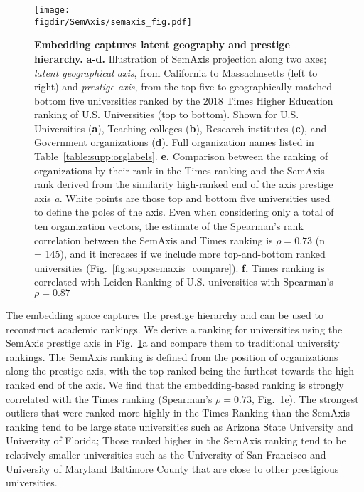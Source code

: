 \documentclass[12pt]{article} %
\def\figdir{../Figs}
\begin{document}
%
%
\begin{figure}[hp!]
	\centering
	\texttt{[image: \\figdir/SemAxis/semaxis\_fig.pdf]}
	\caption{
		\textbf{Embedding captures latent geography and prestige hierarchy.}
		\textbf{a-d.} Illustration of SemAxis projection along two axes;  \textit{latent geographical axis}, from California to Massachusetts (left to right) and \textit{prestige axis}, from the top five to geographically-matched bottom five universities ranked by the 2018 Times Higher Education ranking of U.S. Universities (top to bottom).
		Shown for U.S. Universities (\textbf{a}), Teaching colleges (\textbf{b}), Research institutes (\textbf{c}), and Government organizations (\textbf{d}).
		Full organization names listed in Table~\ref{table:supp:orglabels}.
		\textbf{e.} Comparison between the ranking of organizations by their rank in the Times ranking and the SemAxis rank derived from the similarity high-ranked end of the axis prestige axis \textit{a}.
		White points are those top and bottom five universities used to define the poles of the axis.
	  	Even when considering only a total of ten organization vectors, the estimate of the Spearman's rank correlation between the SemAxis and Times ranking is $\rho = 0.73$ (n = 145), and it increases if we include more top-and-bottom ranked universities (Fig.~\ref{fig:supp:semaxis_compare}).
	  	\textbf{f.} Times ranking is correlated with Leiden Ranking of U.S. universities with Spearman's $\rho = 0.87$
	}
	\label{fig:semaxis}
\end{figure}

The embedding space captures the prestige hierarchy and can be used to reconstruct academic rankings. 
We derive a ranking for universities using the SemAxis prestige axis in Fig.~\ref{fig:semaxis}a and compare them to traditional university rankings.
The SemAxis ranking is defined from the position of organizations along the prestige axis, with the top-ranked being the furthest towards the high-ranked end of the axis.
We find that the embedding-based ranking is strongly correlated with the Times ranking (Spearman's $\rho = 0.73$, Fig.~\ref{fig:semaxis}e).
The strongest outliers that were ranked more highly in the Times Ranking than the SemAxis ranking tend to be large state universities such as Arizona State University and  University of Florida;
Those ranked higher in the SemAxis ranking tend to be relatively-smaller universities such as the University of San Francisco and University of Maryland Baltimore County that are close to other prestigious universities.
\end{document}
